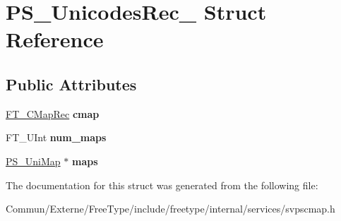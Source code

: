 \hypertarget{struct_p_s___unicodes_rec__}{}\section{P\+S\+\_\+\+Unicodes\+Rec\+\_\+ Struct Reference}
\label{struct_p_s___unicodes_rec__}
\subsection*{Public Attributes}
\begin{DoxyCompactItemize}
\item 
\hyperlink{struct_f_t___c_map_rec__}{F\+T\+\_\+\+C\+Map\+Rec} {\bfseries cmap}\hypertarget{struct_p_s___unicodes_rec___a4c3e28cb86c8a7039107437dcf995da7}{}\label{struct_p_s___unicodes_rec___a4c3e28cb86c8a7039107437dcf995da7}

\item 
F\+T\+\_\+\+U\+Int {\bfseries num\+\_\+maps}\hypertarget{struct_p_s___unicodes_rec___abbc3617f13363ddcf851ee229752b08d}{}\label{struct_p_s___unicodes_rec___abbc3617f13363ddcf851ee229752b08d}

\item 
\hyperlink{struct_p_s___uni_map__}{P\+S\+\_\+\+Uni\+Map} $\ast$ {\bfseries maps}\hypertarget{struct_p_s___unicodes_rec___abd0ff1abe19a2a6a838b631ec81d22cd}{}\label{struct_p_s___unicodes_rec___abd0ff1abe19a2a6a838b631ec81d22cd}

\end{DoxyCompactItemize}


The documentation for this struct was generated from the following file\+:\begin{DoxyCompactItemize}
\item 
Commun/\+Externe/\+Free\+Type/include/freetype/internal/services/svpscmap.\+h\end{DoxyCompactItemize}
